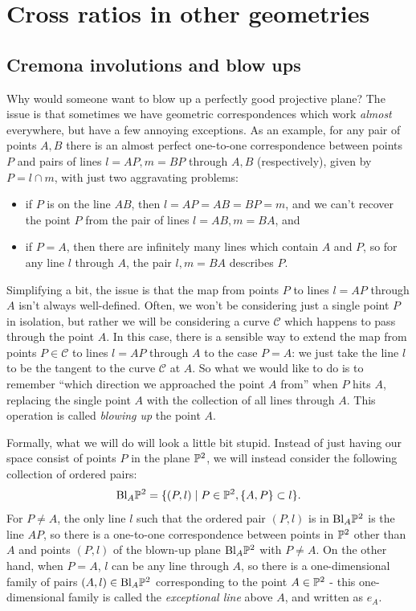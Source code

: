 \bigskip

\section{Cross ratios in other geometries}

\subsection{Cremona involutions and blow ups}

Why would someone want to blow up a perfectly good projective plane? The issue is that sometimes we have geometric correspondences which work \emph{almost} everywhere, but have a few annoying exceptions. As an example, for any pair of points $A,B$ there is an almost perfect one-to-one correspondence between points $P$ and pairs of lines $l = AP, m = BP$ through $A,B$ (respectively), given by $P = l \cap m$, with just two aggravating problems:
\begin{itemize}
\item if $P$ is on the line $AB$, then $l = AP = AB = BP = m$, and we can't recover the point $P$ from the pair of lines $l=AB, m=BA$, and
\item if $P = A$, then there are infinitely many lines which contain $A$ and $P$, so for any line $l$ through $A$, the pair $l, m=BA$ describes $P$.
\end{itemize}

Simplifying a bit, the issue is that the map from points $P$ to lines $l = AP$ through $A$ isn't always well-defined. Often, we won't be considering just a single point $P$ in isolation, but rather we will be considering a curve $\mathcal{C}$ which happens to pass through the point $A$. In this case, there is a sensible way to extend the map from points $P \in \mathcal{C}$ to lines $l = AP$ through $A$ to the case $P = A$: we just take the line $l$ to be the tangent to the curve $\mathcal{C}$ at $A$. So what we would like to do is to remember ``which direction we approached the point $A$ from'' when $P$ hits $A$, replacing the single point $A$ with the collection of all lines through $A$. This operation is called \emph{blowing up} the point $A$.

Formally, what we will do will look a little bit stupid. Instead of just having our space consist of points $P$ in the plane $\mathbb{P}^2$, we will instead consider the following collection of ordered pairs:
\[
\text{\rm Bl}_{A}\mathbb{P}^2 = \{(P, l) \mid P \in \mathbb{P}^2, \{A,P\} \subset l\}.
\]
For $P \ne A$, the only line $l$ such that the ordered pair $(P,l)$ is in $\text{\rm Bl}_A\mathbb{P}^2$ is the line $AP$, so there is a one-to-one correspondence between points in $\mathbb{P}^2$ other than $A$ and points $(P,l)$ of the blown-up plane $\text{\rm Bl}_A\mathbb{P}^2$ with $P \ne A$. On the other hand, when $P = A$, $l$ can be any line through $A$, so there is a one-dimensional family of pairs $(A,l) \in \text{\rm Bl}_A\mathbb{P}^2$ corresponding to the point $A \in \mathbb{P}^2$ - this one-dimensional family is called the \emph{exceptional line} above $A$, and written as $e_A$.


